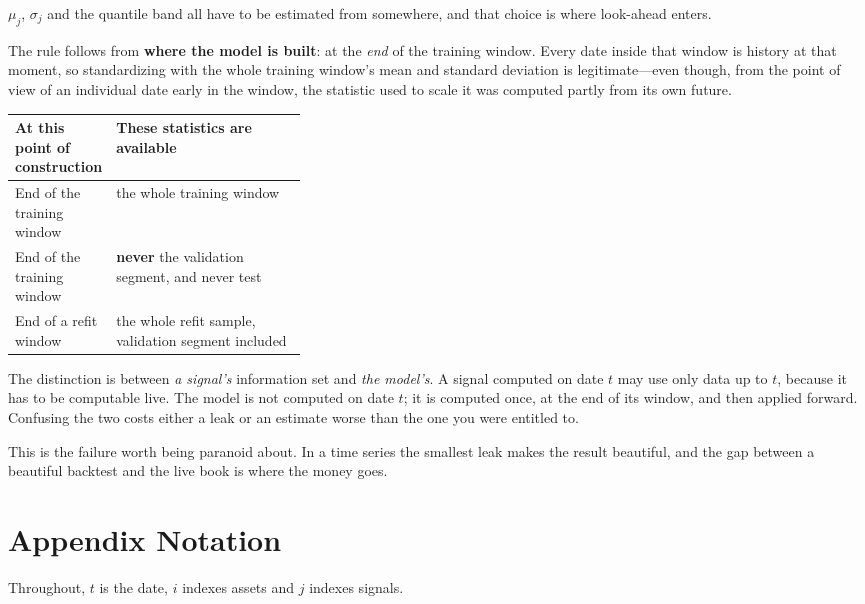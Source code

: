 $\mu_j$, $\sigma_j$ and the quantile band all have to be estimated from somewhere, and that choice
is where look-ahead enters.

The rule follows from \textbf{where the model is built}: at the \emph{end} of the training window.
Every date inside that window is history at that moment, so standardizing with the whole training
window's mean and standard deviation is legitimate---even though, from the point of view of an
individual date early in the window, the statistic used to scale it was computed partly from its
own future.

\begin{tabularx}{\linewidth}{|>{\raggedright\arraybackslash}p{0.34\linewidth}|X|}
\hline
\textbf{At this point of construction} & \textbf{These statistics are available} \\ \hline
End of the training window & the whole training window \\ \hline
End of the training window & \textbf{never} the validation segment, and never test \\ \hline
End of a refit window      & the whole refit sample, validation segment included \\ \hline
\end{tabularx}

\begin{note}
The distinction is between \emph{a signal's} information set and \emph{the model's}. A signal
computed on date $t$ may use only data up to $t$, because it has to be computable live. The model
is not computed on date $t$; it is computed once, at the end of its window, and then applied
forward. Confusing the two costs either a leak or an estimate worse than the one you were entitled
to.
\end{note}

\begin{note}
This is the failure worth being paranoid about. In a time series the smallest leak makes the
result beautiful, and the gap between a beautiful backtest and the live book is where the money
goes.
\end{note}


\section*{Appendix \midot{} Notation}

Throughout, $t$ is the date, $i$ indexes assets and $j$ indexes signals.

